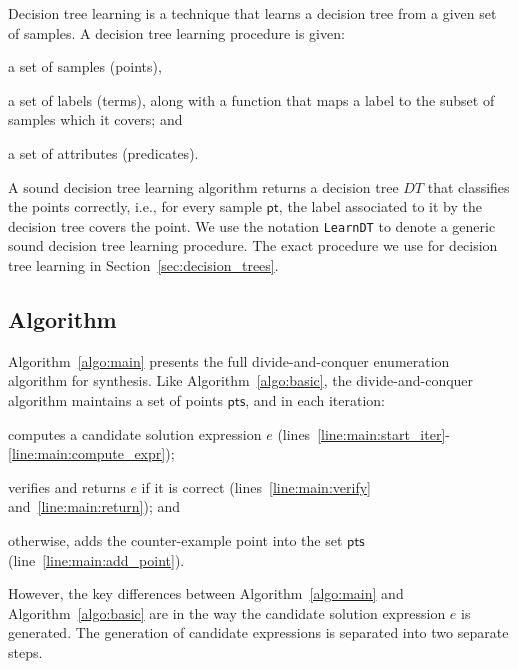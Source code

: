 \documentclass{llncs}
\newcommand\Points{\mathsf{pts}}
\newcommand\Point{\mathsf{pt}}
\newcommand\Expr{e}
\newcommand\DecisionTree{\mathit{DT}}
\begin{document}
Decision tree learning is a technique that learns a decision tree from a
given set of samples.
A decision tree learning procedure is given:
\begin{inparaenum}[(a)]
\item a set of samples (points),
\item a set of labels (terms), along with a function that maps a label to the
  subset of samples which it covers; and
\item a set of attributes (predicates).
\end{inparaenum}
A sound decision tree learning algorithm returns a decision tree
$\DecisionTree$ that classifies the points correctly, i.e., for every
sample $\Point$, the label associated to it by the decision tree covers
the point.
We use the notation {\tt LearnDT} to denote a generic sound
decision tree learning procedure.
The exact procedure we use for decision tree learning in
Section~\ref{sec:decision_trees}.

\subsection{Algorithm}
\label{sec:algo:main}

Algorithm~\ref{algo:main} presents the full divide-and-conquer
enumeration algorithm for synthesis.
Like Algorithm~\ref{algo:basic}, the divide-and-conquer algorithm
maintains a set of points $\Points$, and in each iteration:
\begin{inparaenum}[(a)]
\item computes a candidate solution expression $\Expr$
  (lines~\ref{line:main:start_iter}-\ref{line:main:compute_expr});
\item verifies and returns $\Expr$ if it is correct (lines~\ref{line:main:verify}
  and~\ref{line:main:return}); and
\item otherwise, adds the counter-example point into the set $\Points$
  (line~\ref{line:main:add_point}).
\end{inparaenum}

However, the key differences between Algorithm~\ref{algo:main} and
Algorithm~\ref{algo:basic} are in the way the candidate solution
expression $\Expr$ is generated.
The generation of candidate expressions is separated into two separate
steps.
\end{document}
